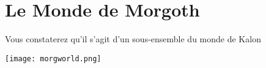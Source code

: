 \chapter*{\sf Le Monde de Morgoth}
\vfill
\begin{center}
Vous constaterez qu'il s'agit d'un sous-ensemble du monde de Kalon
\end{center}
\vfill
	\texttt{[image: morgworld.png]}
\vfill
